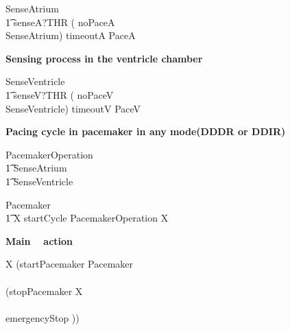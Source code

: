 \begin{circusaction}
SenseAtrium \circdef \\ 
\t1 senseA?THR \then 
    ( noPaceA \then \Skip \\
      \extchoice SenseAtrium) \extchoice timeoutA \then  PaceA 
\end{circusaction}




\textbf {Sensing process in the ventricle chamber}



\begin{circusaction}
SenseVentricle \circdef \\
\t1 senseV?THR \then 
   ( noPaceV \then \Skip \\
   \extchoice SenseVentricle) \extchoice timeoutV \then PaceV
\end{circusaction}




\textbf {Pacing cycle in pacemaker in any mode(DDDR or DDIR)}
\begin{circusaction}
PacemakerOperation \circdef\\
  \t1 SenseAtrium \circseq \\
  \t1 SenseVentricle
\end{circusaction}

\begin{circusaction}
Pacemaker \circdef \\
\t1 \circmu X \circspot startCycle \then PacemakerOperation \circseq X 
\end{circusaction}


\textbf{ Main \Circus~ action }\\

\begin{circusaction}
  \circspot \circmu X \circspot (startPacemaker \then Pacemaker \\ 
   \circinterrupt \\
   (stopPacemaker \then X \\ 
  \extchoice \\
  emergencyStop \then \Stop)) 
\end{circusaction}

